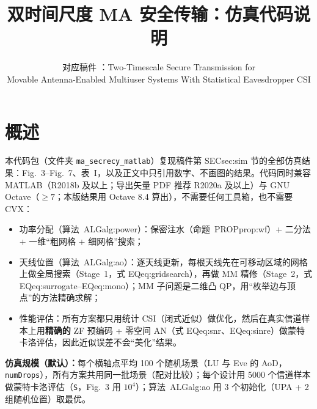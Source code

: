 \documentclass[11pt,a4paper]{ctexart}
\title{双时间尺度 MA 安全传输：仿真代码说明}
\author{对应稿件 \code{main.tex}：Two-Timescale Secure Transmission for\\ Movable Antenna-Enabled Multiuser Systems With Statistical Eavesdropper CSI}
\date{}
\newcommand{\code}[1]{\texttt{#1}}
\begin{document}
\sloppy
\maketitle
\tableofcontents

\section{概述}
本代码包（文件夹 \code{ma\_secrecy\_matlab}）复现稿件第 SEC{sec:sim} 节的全部仿真结果：Fig.~3--Fig.~7、表~I，以及正文中只引用数字、不画图的结果。代码同时兼容 MATLAB（R2018b 及以上；导出矢量 PDF 推荐 R2020a 及以上）与 GNU Octave（$\ge 7$；本版结果用 Octave 8.4 算出），不需要任何工具箱，也不需要 CVX：
\begin{itemize}
\item 功率分配（算法~ALG{alg:power}）：保密注水（命题~PROP{prop:wf}）+ 二分法 + 一维“粗网格 + 细网格”搜索；
\item 天线位置（算法~ALG{alg:ao}）：逐天线更新，每根天线先在可移动区域的网格上做全局搜索（Stage~1，式 EQ{eq:gridsearch}），再做 MM 精修（Stage~2，式 EQ{eq:surrogate}--EQ{eq:mono}）；MM 子问题是二维凸 QP，用“枚举边与顶点”的方法精确求解；
\item 性能评估：所有方案都只用统计 CSI（闭式近似）做优化，然后在真实信道样本上用\textbf{精确的} ZF 预编码 + 零空间 AN（式 EQ{eq:snr}、EQ{eq:sinre}）做蒙特卡洛评估，因此近似误差不会“美化”结果。
\end{itemize}

\textbf{仿真规模（默认）：}每个横轴点平均 100 个随机场景（LU 与 Eve 的 AoD，\code{numDrops}），所有方案共用同一批场景（配对比较）；每个设计用 5000 个信道样本做蒙特卡洛评估（\code{S}，Fig.~3 用 $10^4$）；算法~ALG{alg:ao} 用 3 个初始化（UPA + 2 组随机位置）取最优。

\end{document}
